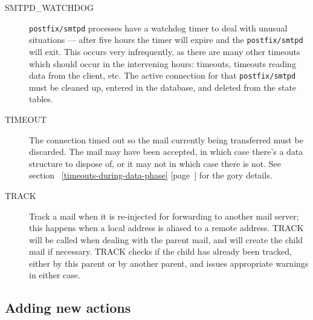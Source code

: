 \documentclass[a4paper,12pt,draft]{article}
\newcommand{\refwithpage}[1]{%
    \empty{}\ref{#1} [page~\pageref{#1}]%
}
\newcommand{\daemon}[1]{%
    \texttt{postfix/#1}%
}
\begin{document}
\begin{description}
    \item [SMTPD\_WATCHDOG] \daemon{smtpd} processes have a watchdog timer
        to deal with unusual situations --- after five hours the timer will
        expire and the \daemon{smtpd} will exit.  This occurs very
        infrequently, as there are many other timeouts which should occur
        in the intervening hours: \DNS{} timeouts, timeouts reading data
        from the client, etc.  The active connection for that
        \daemon{smtpd} must be cleaned up, entered in the database, and
        deleted from the state tables.

    \item [TIMEOUT] The connection timed out so the mail currently being
        transferred must be discarded. The mail may have been accepted, in
        which case there's a data structure to dispose of, or it may not in
        which case there is not.  See
        section~\refwithpage{timeouts-during-data-phase} for the gory
        details.

    \item [TRACK] Track a mail when it is re-injected for forwarding to
        another mail server; this happens when a local address is aliased
        to a remote address.  TRACK will be called when dealing with the
        parent mail, and will create the child mail if necessary. TRACK
        checks if the child has already been tracked, either by this parent
        or by another parent, and issues appropriate warnings in either
        case.

\end{description}

\subsection{Adding new actions}

\label{adding new actions}
\end{document}
